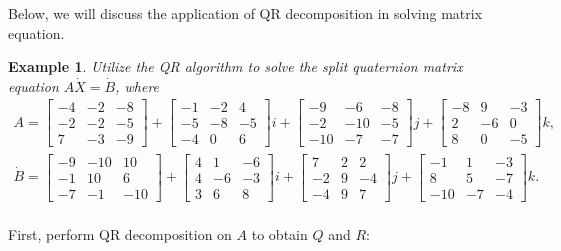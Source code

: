 \documentclass[preprint,12pt]{elsarticle}
\newtheorem{example}[theorem]{Example}
\numberwithin{equation}{section}
\begin{document}
Below, we will discuss the application of QR decomposition in solving matrix equation.
\begin{example}
Utilize the QR algorithm to solve the split quaternion matrix equation \(A\dot{X} = \dot{B}\), where
\begin{align*}
A =
\begin{bmatrix}
-4 & -2 & -8 \\
-2 & -2 & -5 \\
7 & -3 & -9
\end{bmatrix} +
\begin{bmatrix}
-1 & -2 & 4 \\
-5 & -8 & -5 \\
-4 & 0 & 6
\end{bmatrix} i +
\begin{bmatrix}
-9 & -6 & -8 \\
-2 & -10 & -5 \\
-10 & -7 & -7
\end{bmatrix} j +
\begin{bmatrix}
-8 & 9 & -3 \\
2 & -6 & 0 \\
8 & 0 & -5
\end{bmatrix} k,
\\
\dot{B} =
\begin{bmatrix}
-9 & -10 & 10 \\
-1 & 10 & 6 \\
-7 & -1 & -10
\end{bmatrix} +
\begin{bmatrix}
4 & 1 & -6 \\
4 & -6 & -3 \\
3 & 6 & 8
\end{bmatrix} i +
\begin{bmatrix}
7 & 2 & 2 \\
-2 & 9 & -4 \\
-4 & 9 & 7
\end{bmatrix} j +
\begin{bmatrix}
-1 & 1 & -3 \\
8 & 5 & -7 \\
-10 & -7 & -4
\end{bmatrix} k.
\\
\end{align*}
\end{example}  
First, perform QR decomposition on $A$ to obtain $Q$ and $R:$
\end{document}
